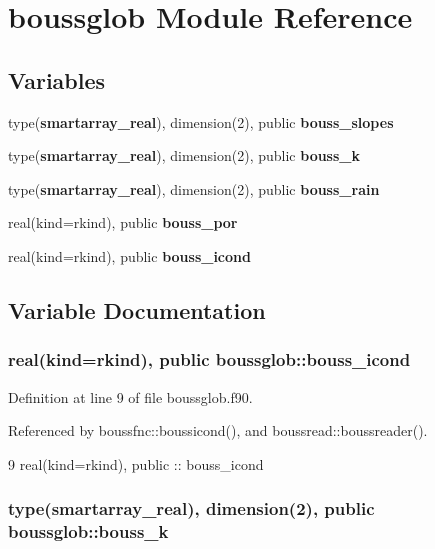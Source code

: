 \section{boussglob Module Reference}
\label{namespaceboussglob}
\subsection*{Variables}
\begin{DoxyCompactItemize}
\item 
type({\bf smartarray\+\_\+real}), dimension(2), public {\bf bouss\+\_\+slopes}
\item 
type({\bf smartarray\+\_\+real}), dimension(2), public {\bf bouss\+\_\+k}
\item 
type({\bf smartarray\+\_\+real}), dimension(2), public {\bf bouss\+\_\+rain}
\item 
real(kind=rkind), public {\bf bouss\+\_\+por}
\item 
real(kind=rkind), public {\bf bouss\+\_\+icond}
\end{DoxyCompactItemize}


\subsection{Variable Documentation}
\subsubsection[{bouss\+\_\+icond}]{\setlength{\rightskip}{0pt plus 5cm}real(kind=rkind), public boussglob\+::bouss\+\_\+icond}\label{namespaceboussglob_ae5f470c00fdc9fc870c35e9bf5286c9f}


Definition at line 9 of file boussglob.\+f90.



Referenced by boussfnc\+::boussicond(), and boussread\+::boussreader().


\begin{DoxyCode}
9   \textcolor{keywordtype}{real(kind=rkind)}, \textcolor{keywordtype}{public} :: bouss_icond
\end{DoxyCode}
\subsubsection[{bouss\+\_\+k}]{\setlength{\rightskip}{0pt plus 5cm}type({\bf smartarray\+\_\+real}), dimension(2), public boussglob\+::bouss\+\_\+k}\label{namespaceboussglob_a4b547b1281175037fcf8625db6be6110}


